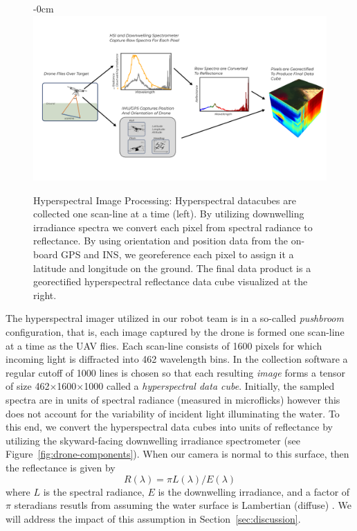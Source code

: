 \documentclass[journal,article,submit,pdftex,moreauthors]{Definitions/mdpi}
\begin{document}
\begin{figure}[H]
\begin{adjustwidth}{-\extralength}{0cm}
\centering
\includegraphics[width=16cm]{paper/figures/materials-and-methods/pipeline-figure-2.pdf}
\end{adjustwidth}
\caption{Hyperspectral Image Processing: Hyperspectral datacubes are collected one scan-line at a time (left). By utilizing downwelling irradiance spectra we convert each pixel from spectral radiance to reflectance. By using orientation and position data from the on-board GPS and INS, we georeference each pixel to assign it a latitude and longitude on the ground. The final data product is a georectified hyperspectral reflectance data cube visualized at the right. \label{fig:hsi-pipeline}}
\end{figure}  

The hyperspectral imager utilized in our robot team is in a so-called \textit{pushbroom} configuration, that is, each image captured by the drone is formed one scan-line at a time as the UAV flies. Each scan-line consists of 1600 pixels for which incoming light is diffracted into 462 wavelength bins. In the collection software a regular cutoff of 1000 lines is chosen so that each resulting \textit{image} forms a tensor of size 462$\times$1600$\times$1000 called a \textit{hyperspectral data cube}. Initially, the sampled spectra are in units of spectral radiance (measured in microflicks) however this does not account for the variability of incident light illuminating the water. To this end, we convert the hyperspectral data cubes into units of reflectance by utilizing the skyward-facing downwelling irradiance spectrometer (see Figure~\ref{fig:drone-components}). When our camera is normal to this surface, then the reflectance is given by
\begin{equation}
    R(\lambda) = \pi L(\lambda)/E(\lambda)
\end{equation}
where $L$ is the spectral radiance, $E$ is the downwelling irradiance, and a factor of $\pi$ steradians resutls from assuming the water surface is Lambertian (diffuse) \cite{reflectance-conversion}. We will address the impact of this assumption in Section~\ref{sec:discussion}.
\end{document}
